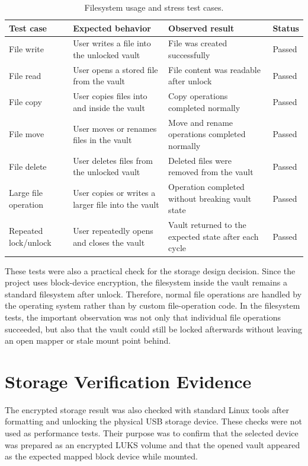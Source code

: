 \begin{table}[!htbp]
\centering
\caption{\label{tab:filesystem-tests}Filesystem usage and stress test cases.}
\small
\begin{tabularx}{\textwidth}{lXXX}
\toprule
Test case & Expected behavior & Observed result & Status\\
\midrule
File write & User writes a file into the unlocked vault & File was created successfully & Passed\\
File read & User opens a stored file from the vault & File content was readable after unlock & Passed\\
File copy & User copies files into and inside the vault & Copy operations completed normally & Passed\\
File move & User moves or renames files in the vault & Move and rename operations completed normally & Passed\\
File delete & User deletes files from the unlocked vault & Deleted files were removed from the vault & Passed\\
Large file operation & User copies or writes a larger file into the vault & Operation completed without breaking vault state & Passed\\
Repeated lock/unlock & User repeatedly opens and closes the vault & Vault returned to the expected state after each cycle & Passed\\
\bottomrule
\end{tabularx}
\end{table}

These tests were also a practical check for the storage design decision. Since the project uses block-device encryption, the filesystem inside the vault remains a standard filesystem after unlock. Therefore, normal file operations are handled by the operating system rather than by custom file-operation code. In the filesystem tests, the important observation was not only that individual file operations succeeded, but also that the vault could still be locked afterwards without leaving an open mapper or stale mount point behind.

\section{Storage Verification Evidence}

The encrypted storage result was also checked with standard Linux tools after formatting and unlocking the physical USB storage device. These checks were not used as performance tests. Their purpose was to confirm that the selected device was prepared as an encrypted LUKS volume and that the opened vault appeared as the expected mapped block device while mounted.

